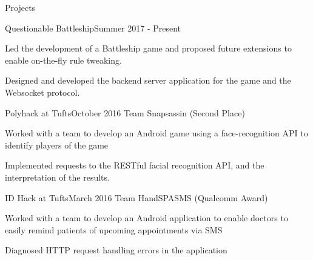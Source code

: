 \documentclass{resume} %
\begin{document}
\begin{rSection}{Projects}




\begin{rSubsection}{Questionable Battleship}{Summer 2017 - Present}{}

\item Led the development of a Battleship game and proposed future extensions to
    enable on-the-fly rule tweaking.

\item Designed and developed the backend server application for the game and the
    Websocket protocol.

\end{rSubsection}

\begin{rSubsection}{Polyhack at Tufts}{October 2016}
    {Team Snapsassin (Second Place)}

\item Worked with a team to develop an Android game using a face-recognition
    API to identify players of the game

\item Implemented requests to the RESTful facial recognition API, and the
    interpretation of the results.

\end{rSubsection}

\begin{rSubsection}{ID Hack at Tufts}{March 2016}
    {Team HandSPASMS (Qualcomm Award)}

\item Worked with a team to develop an Android application to enable doctors
    to easily remind patients of upcoming appointments via SMS

\item Diagnosed HTTP request handling errors in the application

\end{rSubsection}
\end{rSection}
\end{document}
